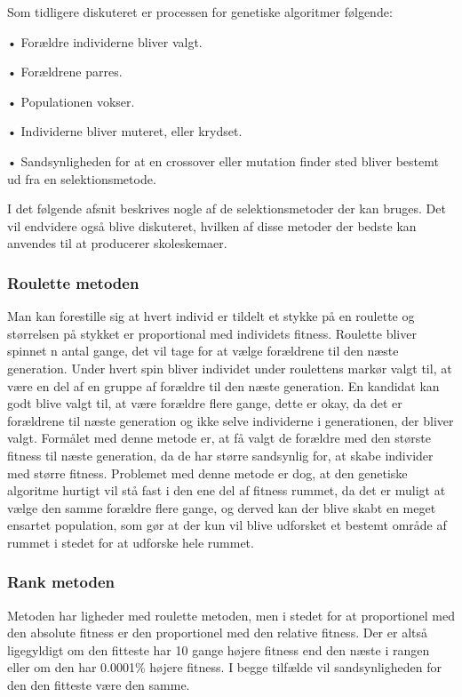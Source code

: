 Som tidligere diskuteret er processen for genetiske algoritmer følgende:

•	Forældre individerne bliver valgt.

•	Forældrene parres.

•	Populationen vokser.

•	Individerne bliver muteret, eller krydset.

•	Sandsynligheden for at en crossover eller mutation finder sted bliver bestemt ud fra en selektionsmetode.

I det følgende afsnit beskrives nogle af de selektionsmetoder der kan bruges. Det vil endvidere også blive diskuteret, hvilken af disse metoder der bedste kan anvendes til at producerer skoleskemaer.

\subsubsection{Roulette metoden}

Man kan forestille sig at hvert individ er tildelt et stykke på en roulette og størrelsen på stykket er proportional med individets fitness. Roulette bliver spinnet n antal gange, det vil tage for at vælge forældrene til den næste generation. Under hvert spin bliver individet under roulettens markør valgt til, at være en del af en gruppe af forældre til den næste generation. En kandidat kan godt blive valgt til, at være forældre flere gange, dette er okay, da det er forældrene til næste generation og ikke selve individerne i generationen, der bliver valgt. Formålet med denne metode er, at få valgt de forældre med den største fitness til næste generation, da de har større sandsynlig for, at skabe individer med større fitness. Problemet med denne metode er dog, at den genetiske algoritme hurtigt vil stå fast i den ene del af fitness rummet, da det er muligt at vælge den samme forældre flere gange, og derved kan der blive skabt en meget ensartet population, som gør at der kun vil blive udforsket et bestemt område af rummet i stedet for at udforske hele rummet.

\subsubsection{Rank metoden}

Metoden har ligheder med roulette metoden, men i stedet for at proportionel med den absolute fitness er den proportionel med den relative fitness. Der er altså ligegyldigt om den fitteste har 10 gange højere fitness end den næste i rangen eller om den har 0.0001\% højere fitness. I begge tilfælde vil sandsynligheden for den den fitteste være den samme.

